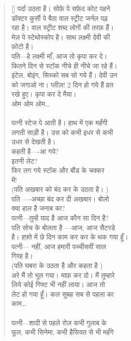 \begin{verse}[\versewidth]\texthindi{
पर्दा उठता है। सोफ़े पे सफ़ेद कोट पहने\\
डॉक्टर कुर्सी पे बैठा वाल स्ट्रीट जर्नल पढ़\\
रहा है। वाल स्ट्रीट शब्द लोगों की तरफ़ हैं।\\
मेज़ पे स्टेथोस्कोप है। साथ लक्ष्मी देवी की\\
फ़ोटो है।\\
पति—हे लक्ष्मी माँ, आज तो कृपा कर दे।\\
कितने दिन से स्टॉक नीचे ही नीचे जा रहे हैं।\\
इंटेल, बोइंग, सिस्को सब सो गये हैं। देवी उन\\
को जगाओ ना। प्लीज़! 2 दिन हो गये हैं व्रत\\
रखे हुए। कृपा कर दे मैया।\\
ओम ओम ओम…\\
\\
पत्नी स्टेज पे आती है। हाथ में एक महँगी\\
लगती साड़ी है। उस को कभी इधर से कभी\\
उधर से देखती है।\\
कहती है—-आ गये?\\
इतनी लेट?\\
फिर लग गये स्टॉक और बौंड के चक्कर\\
में!\\
(पति अखबार को बंद कर के उठता है।
)\\
पति —-अच्छा बंद कर दी अखबार। बोलो\\
क्या हाल है जनाब का?\\
पत्नी—तुम्हें याद है आज कौन सा दिन है?\\
पति सोच के बोलता है —आज, आज सैटरडे\\
है। हफ़्ते में छे दिन काम कर कर के थक गया हूँ।\\
पत्नी— नहीं, आज हमारी पच्चीसवीं साल\\
गिरह है।\\
(पति घबरा के उठता है और कहता है
)\\
अरे मैं तो भूल गया। माफ़ कर दो। मैं तुम्हारे\\
लिये कोई गिफ्ट भी नहीं लाया। आज तो\\
लेट हो गया हूँ। कल सुबह सब से पहला का\\
काम…\\
\\
पत्नी—शादी से पहले रोज़ कभी गुलाब के \\
फूल, कभी सिनेमा, कभी हैसियत से भी महँगे\\
}
\end{verse}
